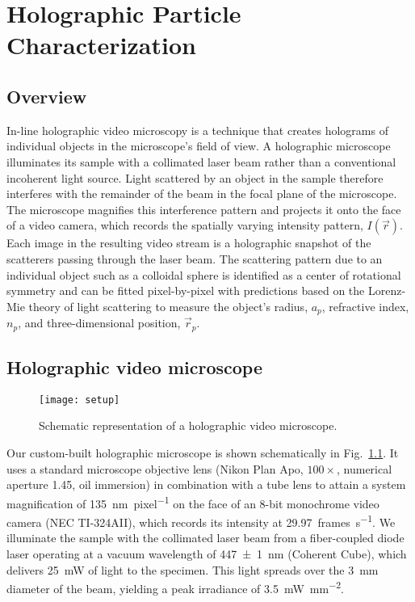 \chapter{Holographic Particle Characterization}
\label{ch:HPC}

\section{Overview}
\label{sec:overview}

In-line holographic video microscopy \cite{sheng06,lee07,lee07a} 
is a technique that creates holograms of individual objects in 
the microscope's field of view.
A holographic microscope illuminates
its sample with a collimated laser beam rather than
a conventional incoherent light source.
Light scattered by an object in the sample therefore
interferes with the remainder of the beam in the focal
plane of the microscope.  The microscope
magnifies this interference pattern and projects it onto the
face of a video camera, which records the spatially varying
intensity pattern, $I(\vec{r})$.
Each image in the resulting video stream is a holographic
snapshot of the scatterers passing through the laser beam. 
The scattering pattern due to an individual object such as a 
colloidal sphere is identified
as a center of rotational symmetry
and can be fitted pixel-by-pixel with predictions 
\cite{lee07a,cheong10a,krishnatreya14} based on the
Lorenz-Mie theory of light scattering 
\cite{bohren83,mishchenko02,gouesbet11}
to measure the object's radius, $a_p$, refractive index, $n_p$,
and three-dimensional position, $\vec{r}_p$.

\section{Holographic video microscope}
\label{sec:microscope}

\begin{figure}[h!]
  \centering
  \texttt{[image: setup]}
  \caption[Schematic representation of a holographic video microscope]
  {Schematic representation of a holographic video microscope.}
  \label{fig:setup}
\end{figure}

Our custom-built holographic microscope \cite{krishnatreya14} 
is shown schematically in Fig.~\ref{fig:setup}. It uses a standard microscope objective lens (Nikon Plan Apo, $100\times$, numerical aperture 1.45, oil immersion) in combination with a tube lens to attain a system magnification of
\SI{135}{\nm\per pixel} on the face of an 8-bit monochrome
video camera (NEC TI-324AII), which records its intensity
at \SI{29.97}{frames\per\second}.
We illuminate the sample with the collimated laser beam
from a fiber-coupled diode laser operating at a vacuum wavelength 
of \SI{447 \pm 1}{\nm} (Coherent Cube), which delivers
\SI{25}{\milli\watt} of light to the specimen. 
This light spreads over the \SI{3}{\mm} diameter of the beam,
yielding a peak irradiance of \SI{3.5}{\milli\watt\per\square\mm}.


